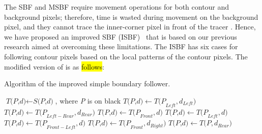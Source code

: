 \documentclass[sensors,article,accept,moreauthors,pdftex,10pt,a4paper]{mdpi}
\begin{document}
The SBF and MSBF require movement operations for both contour and background pixels; therefore, time is wasted during movement on the background pixel, and they cannot trace the inner-corner pixel in front of the tracer \cite{Cheong2006Improved,Ghuneim2015Contour}. Hence, we have proposed an improved SBF (ISBF)~\cite{Cheong2006Improved} that is based on our previous research aimed at overcoming these limitations. The ISBF has six cases for following contour pixels based on the local patterns of the contour pixels. The modified version of \cite{Cheong2012Advanced} is as \hl{follows}: 


\begin{algorithm}[H]
	\caption{Algorithm of the improved simple boundary follower.}\label{alg:isbf}
	\begin{algorithmic}[1]
	\begin{spacing}{1.5}%
	\State $\textit{T(P,d)} \gets \textit{S(P,d)}$, where \textit{P} is on black
	\Do
		\State $\textit{T(P,d)} \gets \textit{T(P}_{Left},\textit{d}_{Left} ) $
	\Else
			\State $\textit{T(P,d)} \gets \textit{T(P}_{Left-Rear},\textit{d}_{Rear} ) $
		\Else
					\State $\textit{T(P,d)} \gets \textit{T(P}_{Front},\textit{d} ) $
					\State $\textit{T(P,d)} \gets \textit{T(P}_{Left}, \textit{d})$
				\Else
					\State $\textit{T(P,d)} \gets \textit{T(P}_{Front-Left},\textit{d} ) $
				\EndIf
				\State $\textit{T(P,d)} \gets \textit{T(P}_{Front},\textit{d}_{Right} ) $
			\Else
				\State $\textit{T(P,d)} \gets \textit{T(P},\textit{d}_{Rear} ) $
			\EndIf
		\EndIf
	\EndIf \linebreak\vspace{-6pt}
	\EndProcedure\vspace{-12pt}
	\end{spacing}%
	\end{algorithmic}
\end{algorithm}
\end{document}
